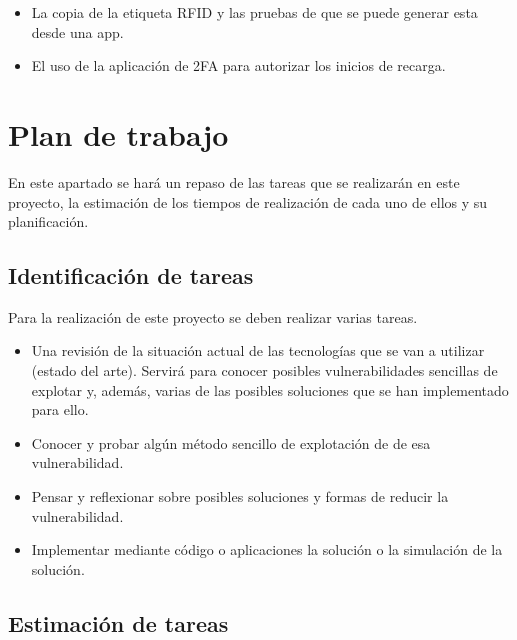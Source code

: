 \documentclass[12pt,a4paper,onecolumn,oneside]{report}
\begin{document}
\begin{itemize}
\item La copia de la etiqueta RFID y las pruebas de que se puede generar esta desde una app.
\item El uso de la aplicación de 2FA para autorizar los inicios de recarga.
\end{itemize}

\section{Plan de trabajo}
\label{Plan de trabajo}

En este apartado se hará un repaso de las tareas que se realizarán en este proyecto, la estimación de los tiempos de realización de cada uno de ellos y su planificación.

\subsection{Identificación de tareas}

Para la realización de este proyecto se deben realizar varias tareas. 
\begin{itemize}
\item Una revisión de la situación actual de las tecnologías que se van a utilizar (estado del arte). Servirá para conocer posibles vulnerabilidades sencillas de explotar y, además, varias de las posibles soluciones que se han implementado para ello.
\item Conocer y probar algún método sencillo de explotación de de esa vulnerabilidad.
\item Pensar y reflexionar sobre posibles soluciones y formas de reducir la vulnerabilidad.
\item Implementar mediante código o aplicaciones la solución o la simulación de la solución.
\end{itemize}

\subsection{Estimación de tareas}
\end{document}
